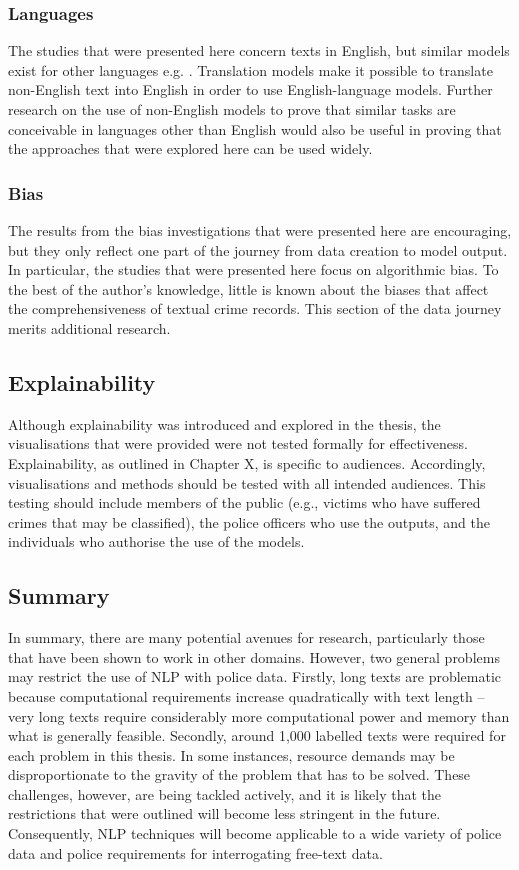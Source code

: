 \subsubsection{Languages}The studies that were presented here concern texts in English, but similar models exist for other languages e.g. \parencite{scao2022bloom}. Translation models make it possible to translate non-English text into English in order to use English-language models. Further research on the use of non-English models to prove that similar tasks are conceivable in languages other than English would also be useful in proving that the approaches that were explored here can be used widely.


\subsubsection{Bias} The results from the bias investigations that were presented here are encouraging, but they only reflect one part of the journey from data creation to model output. In particular, the studies that were presented here focus on algorithmic bias. To the best of the author’s knowledge, little is known about the biases that affect the comprehensiveness of textual crime records. This section of the data journey merits additional research.

\subsection{Explainability} Although explainability was introduced and explored in the thesis, the visualisations that were provided were not tested formally for effectiveness. Explainability, as outlined in Chapter X, is specific to audiences. Accordingly, visualisations and methods should be tested with all intended audiences. This testing should include members of the public (e.g., victims who have suffered crimes that may be classified), the police officers who use the outputs, and the individuals who authorise the use of the models.

\subsection{Summary} In summary, there are many potential avenues for research, particularly those that have been shown to work in other domains. However, two general problems may restrict the use of NLP with police data. Firstly, long texts are problematic because computational requirements increase quadratically with text length – very long texts require considerably more computational power and memory than what is generally feasible. Secondly, around 1,000 labelled texts were required for each problem in this thesis. In some instances, resource demands may be disproportionate to the gravity of the problem that has to be solved. These challenges, however, are being tackled actively, and it is likely that the restrictions that were outlined will become less stringent in the future. Consequently, NLP techniques will become applicable to a wide variety of police data and police requirements for interrogating free-text data.


